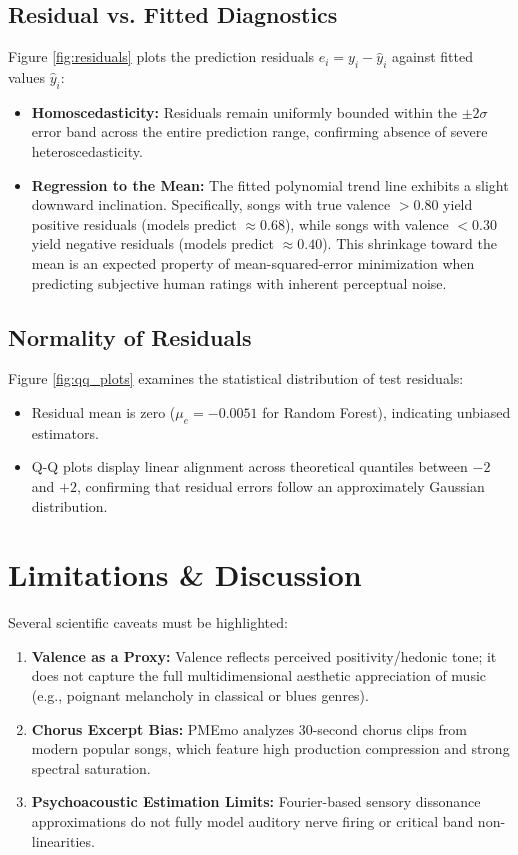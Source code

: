 \documentclass[conference]{IEEEtran}
\begin{document}
\subsection{Residual vs. Fitted Diagnostics}
Figure \ref{fig:residuals} plots the prediction residuals $e_i = y_i - \hat{y}_i$ against fitted values $\hat{y}_i$:
\begin{itemize}
    \item \textbf{Homoscedasticity:} Residuals remain uniformly bounded within the $\pm 2\sigma$ error band across the entire prediction range, confirming absence of severe heteroscedasticity.
    \item \textbf{Regression to the Mean:} The fitted polynomial trend line exhibits a slight downward inclination. Specifically, songs with true valence $> 0.80$ yield positive residuals (models predict $\approx 0.68$), while songs with valence $< 0.30$ yield negative residuals (models predict $\approx 0.40$). This shrinkage toward the mean is an expected property of mean-squared-error minimization when predicting subjective human ratings with inherent perceptual noise.
\end{itemize}

\subsection{Normality of Residuals}
Figure \ref{fig:qq_plots} examines the statistical distribution of test residuals:
\begin{itemize}
    \item Residual mean is zero ($\mu_e = -0.0051$ for Random Forest), indicating unbiased estimators.
    \item Q-Q plots display linear alignment across theoretical quantiles between $-2$ and $+2$, confirming that residual errors follow an approximately Gaussian distribution.
\end{itemize}

\section{Limitations \& Discussion}
Several scientific caveats must be highlighted:
\begin{enumerate}
    \item \textbf{Valence as a Proxy:} Valence reflects perceived positivity/hedonic tone; it does not capture the full multidimensional aesthetic appreciation of music (e.g., poignant melancholy in classical or blues genres).
    \item \textbf{Chorus Excerpt Bias:} PMEmo analyzes 30-second chorus clips from modern popular songs, which feature high production compression and strong spectral saturation.
    \item \textbf{Psychoacoustic Estimation Limits:} Fourier-based sensory dissonance approximations do not fully model auditory nerve firing or critical band non-linearities.
\end{enumerate}
\end{document}
